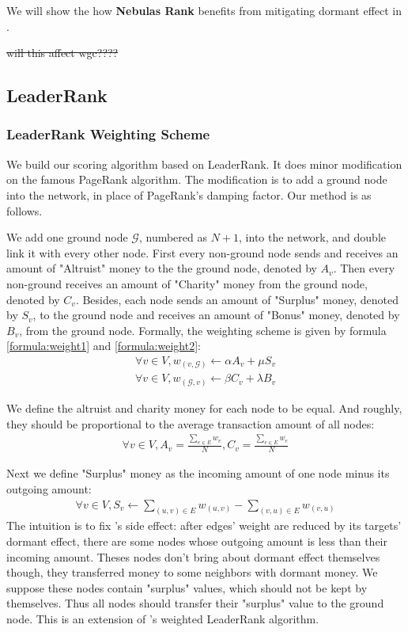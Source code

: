 We will show the how \textbf{Nebulas Rank} benefits from mitigating dormant effect in .

\st{will this affect wgc????}

\subsection{LeaderRank} \label{sec:leaderrank}

\subsubsection{LeaderRank Weighting Scheme}
We build our scoring algorithm based on LeaderRank\cite{Li2014}\cite{Chen2013}. It does minor modification on the famous PageRank algorithm\cite{Brin2010}\cite{page1999pagerank}. The modification is to add a ground node into the network, in place of PageRank's damping factor. Our method is as follows.

We add one ground node $\mathcal{G}$, numbered as $N+1$, into the network, and double link it with every other node. First every non-ground node sends and receives an amount of "Altruist" money to the the ground node, denoted by $A_v$. Then every non-ground receives an amount of "Charity" money from the ground node, denoted by $C_v$. Besides, each node sends an amount of "Surplus" money, denoted by $S_v$, to the ground node and receives an amount of "Bonus" money, denoted by $B_v$, from the ground node. Formally, the weighting scheme is given by formula \ref{formula:weight1} and \ref{formula:weight2}:
\begin{align}\label{formula:weight1}
	\forall v \in V, w_{(v, \mathcal{G})} \leftarrow \alpha A_v + \mu S_v
\end{align}
\begin{align}\label{formula:weight2}
\forall v \in V, w_{(\mathcal{G}, v)} \leftarrow \beta C_v + \lambda B_v
\end{align}

We define the altruist and charity money for each node to be equal. And roughly, they should be proportional to the average transaction amount of all nodes:
\begin{align}
\forall v \in V, A_v = \frac{\sum_{e\in E} w_e}{N}, C_v =  \frac{\sum_{e\in E} w_e}{N}
\end{align}

Next we define "Surplus" money as the incoming amount of one node minus its outgoing amount:
\begin{align}
	\forall v \in V, S_v \leftarrow \sum_{(u,v)\in E} w_{(u,v)} - \sum_{(v,u) \in E} w_{(v,u) }
\end{align}
The intuition is to fix 's side effect: after edges' weight are reduced by its targets' dormant effect, there are some nodes whose outgoing amount is less than their incoming amount. Theses nodes don't bring about dormant effect themselves though, they transferred money to some neighbors with dormant money. We suppose these nodes contain "surplus" values, which should not be kept by themselves. Thus all nodes should transfer their "surplus" value to the ground node. This is an extension of \textcite{Li2014}'s weighted LeaderRank algorithm.

